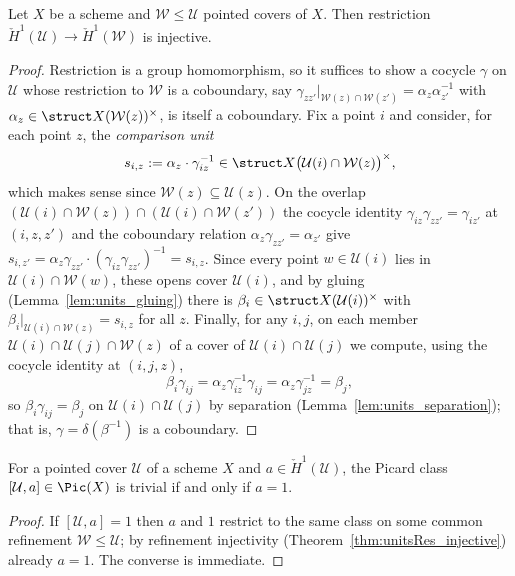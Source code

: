 \begin{theorem}
  \label{thm:unitsRes_injective}
  \leanok
  Let \(X\) be a scheme and \(\mathcal W \le \mathcal U\) pointed covers of \(X\). Then
  restriction \(\check H^1(\mathcal U) \to \check H^1(\mathcal W)\) is injective.
\end{theorem}
\begin{proof}
  \leanok
  Restriction is a group homomorphism, so it suffices to show a cocycle \(\gamma\) on
  \(\mathcal U\) whose restriction to \(\mathcal W\) is a coboundary, say
  \(\gamma_{zz'}|_{\mathcal W(z) \cap \mathcal W(z')} = \alpha_z \alpha_{z'}^{-1}\) with
  \(\alpha_z \in \struct X(\mathcal W(z))^{\times}\), is itself a coboundary. Fix a point
  \(i\) and consider, for each point \(z\), the \emph{comparison unit}
  \[ s_{i,z} := \alpha_z \cdot \gamma_{iz}^{-1}
     \in \struct X\bigl(\mathcal U(i) \cap \mathcal W(z)\bigr)^{\times}, \]
  which makes sense since \(\mathcal W(z) \subseteq \mathcal U(z)\). On the overlap
  \((\mathcal U(i) \cap \mathcal W(z)) \cap (\mathcal U(i) \cap \mathcal W(z'))\) the cocycle
  identity \(\gamma_{iz}\gamma_{zz'} = \gamma_{iz'}\) at \((i,z,z')\) and the coboundary
  relation \(\alpha_z \gamma_{zz'} = \alpha_{z'}\) give
  \(s_{i,z'} = \alpha_z\gamma_{zz'}\cdot(\gamma_{iz}\gamma_{zz'})^{-1} = s_{i,z}\). Since
  every point \(w \in \mathcal U(i)\) lies in \(\mathcal U(i) \cap \mathcal W(w)\), these
  opens cover \(\mathcal U(i)\), and by gluing (Lemma~\ref{lem:units_gluing}) there is
  \(\beta_i \in \struct X(\mathcal U(i))^{\times}\) with
  \(\beta_i|_{\mathcal U(i) \cap \mathcal W(z)} = s_{i,z}\) for all \(z\). Finally, for any
  \(i, j\), on each member \(\mathcal U(i) \cap \mathcal U(j) \cap \mathcal W(z)\) of a cover
  of \(\mathcal U(i) \cap \mathcal U(j)\) we compute, using the cocycle identity at
  \((i,j,z)\),
  \[ \beta_i \gamma_{ij} = \alpha_z \gamma_{iz}^{-1}\gamma_{ij}
       = \alpha_z \gamma_{jz}^{-1} = \beta_j , \]
  so \(\beta_i \gamma_{ij} = \beta_j\) on \(\mathcal U(i) \cap \mathcal U(j)\) by separation
  (Lemma~\ref{lem:units_separation}); that is, \(\gamma = \delta(\beta^{-1})\) is a
  coboundary.
\end{proof}

\begin{corollary}
  \label{cor:cechPic_mk_eq_one}
  \leanok
  For a pointed cover \(\mathcal U\) of a scheme \(X\) and \(a \in \check H^1(\mathcal U)\),
  the Picard class \([\mathcal U, a] \in \Pic(X)\) is trivial if and only if \(a = 1\).
\end{corollary}
\begin{proof}
  \leanok
  If \([\mathcal U, a] = 1\) then \(a\) and \(1\) restrict to the same class on some common
  refinement \(\mathcal W \le \mathcal U\); by refinement injectivity
  (Theorem~\ref{thm:unitsRes_injective}) already \(a = 1\). The converse is immediate.
\end{proof}

